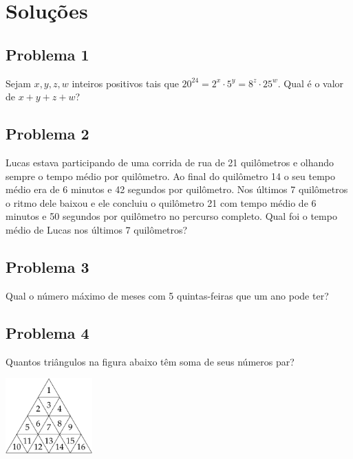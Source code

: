 \documentclass[12pt]{article}
\begin{document}
  \section{\textsf{Soluções}}
  \subsection{Problema 1}
\begin{tcolorbox}[statementbox]
  Sejam \(x, y, z, w\) inteiros positivos tais que \(20^{24} = 2^x \cdot 5^y = 8^z \cdot 25^w\). Qual é o valor de \(x + y + z + w\)?
\end{tcolorbox}

\clearpage

\subsection{Problema 2}
\begin{tcolorbox}[statementbox]
Lucas estava participando de uma corrida de rua de 21 quilômetros e olhando sempre o tempo médio por quilômetro. Ao final do
quilômetro 14 o seu tempo médio era de 6 minutos e 42 segundos por quilômetro. Nos últimos 7 quilômetros o ritmo dele baixou e ele
concluiu o quilômetro 21 com tempo médio de 6 minutos e 50 segundos por quilômetro no percurso completo. Qual foi o tempo médio de
Lucas nos últimos 7 quilômetros?
\end{tcolorbox}

\clearpage

\subsection{Problema 3}
\begin{tcolorbox}[statementbox]
Qual o número máximo de meses com 5 quintas-feiras que um ano pode ter?
\end{tcolorbox}

\clearpage

\subsection{Problema 4}
\begin{tcolorbox}[statementbox]
Quantos triângulos na figura abaixo têm soma de seus números par?
\begin{center}
  \includegraphics[width=0.25\textwidth]{first.png}
\end{center}
\end{tcolorbox}
\end{document}
